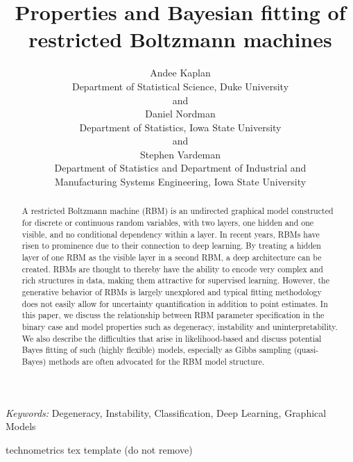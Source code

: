 \documentclass[]{article}
\theoremstyle{definition}
\begin{document}
\def\spacingset#1{\renewcommand{\baselinestretch}%
{#1}\small\normalsize} \spacingset{1}

\title{\bf Properties and Bayesian fitting of restricted Boltzmann machines}
\author{Andee Kaplan \\ Department of Statistical Science, Duke University \\  and \\ Daniel Nordman \\ Department of Statistics, Iowa State University \\  and \\ Stephen Vardeman \\ Department of Statistics and Department of Industrial and\\
Manufacturing Systems Engineering, Iowa State University \\ }

\maketitle
\begin{abstract}
A restricted Boltzmann machine (RBM) is an undirected graphical model
constructed for discrete or continuous random variables, with two
layers, one hidden and one visible, and no conditional dependency within
a layer. In recent years, RBMs have risen to prominence due to their
connection to deep learning. By treating a hidden layer of one RBM as
the visible layer in a second RBM, a deep architecture can be created.
RBMs are thought to thereby have the ability to encode very complex and
rich structures in data, making them attractive for supervised learning.
However, the generative behavior of RBMs is largely unexplored and
typical fitting methodology does not easily allow for uncertainty
quantification in addition to point estimates. In this paper, we discuss
the relationship between RBM parameter specification in the binary case
and model properties such as degeneracy, instability and
uninterpretability. We also describe the difficulties that arise in
likelihood-based and discuss potential Bayes fitting of such (highly
flexible) models, especially as Gibbs sampling (quasi-Bayes) methods are
often advocated for the RBM model structure.
\end{abstract}
\noindent%
{\it Keywords:}  Degeneracy, Instability, Classification, Deep Learning, Graphical Models
\vfill

\hfill {\tiny technometrics tex template (do not remove)}
\newpage
\spacingset{1.45} %
\end{document}

